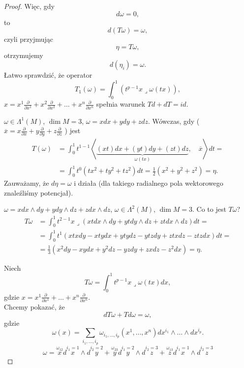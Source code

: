 \documentclass[../main.tex]{subfiles}
\begin{document}
\begin{proof}
    Więc, gdy
    \[
        d\omega = 0
    ,\]
to
    \[
        d(T\omega) = \omega
    ,\]
    czyli przyjmując
 \[
\eta = T\omega
,\]
otrzymujemy
\[
    d(\eta_i) = \omega
.\]
Łatwo sprawdzić, że operator
\[
    T_1(\omega) = \int_0^1\left(t^{p-1}x \lrcorner \omega(tx)\right)
,\]
$x = x^1 \frac{\partial }{\partial x^1} + x^2 \frac{\partial }{\partial x^2} + \ldots + x^n \frac{\partial }{\partial x^n}$ spełnia warunek $Td + dT = id$.
 \begin{przyklad}
     $\omega \in \Lambda^1(M)$, $\dim M = 3$, $\omega = xdx + ydy + zdz$. Wówczas, gdy ($\overline{x} = x \frac{\partial }{\partial x} + y \frac{\partial }{\partial y} + z \frac{\partial }{\partial z}$ ) jest
     \begin{align*}
         T(\omega) &= \int_0^1 t^{1-1} \left<\underbrace{(xt)dx + (yt)dy + (zt)dz}_{\omega(tx)},\quad \overline{x} \right>dt = \\
         &= \int_0^1t^0\left( tx^2 + ty^2 + tz^2 \right) dt = \frac{1}{2}\left( x^2 + y^2 + z^2 \right) = \eta.
     \end{align*}
     Zauważamy, że $d\eta = \omega$ i działa (dla takiego radialnego pola wektorowego znaleźliśmy potencjał).
\end{przyklad}
\begin{przyklad}
    $\omega = xdx\land dy + ydy\land dz + zdx\land dz$,  $\omega\in \Lambda^2(M)$, $\dim M = 3$.
    Co to jest $T\omega$?
    \begin{align*}
        T\omega &= \int_0^1t^{2-1} x \lrcorner \left( xt dx\land dy + yt dy\land dz + zt dx\land dz \right) dt = \\
        &= \int_0^1 t^1\left( xtx dy - xt ydx + yt ydz - ytzdy + ztxdz - ztzdx \right)dt = \\
        &= \frac{1}{3}\left( x^2dy - xydx + y^2dz - yzdy + zxdz - z^2dx \right) = \eta
    .\end{align*}
\end{przyklad}
Niech
\[
    T\omega = \int_0^1 t^{p-1} x \lrcorner \omega(tx)dx
,\]
gdzie $x = x^1 \frac{\partial }{\partial x^1} + \ldots + x^n \frac{\partial }{\partial x^n} $.\\
Chcemy pokazać, że
\[
dT\omega + Td\omega = \omega
,\]
gdzie
\[
    \omega(x) = \sum_{i_1, \ldots, i_p}\omega_{i_1, \ldots, i_p}(x^1, \ldots, x^n)dx^{i_1}\land \ldots\land dx^{i_p}
.\]
\[
    \omega = \overset{\omega_{12}}{x} d\overset{i_1 = 1}{x}\land d\overset{i_2 = 2}{y} + \overset{\omega_{23}}{y}d\overset{i_1 = 2}{y}\land d\overset{i_2 = 3}{z} + \overset{\omega_{13}}{z}d\overset{i_1 = 1}{x}\land d\overset{i_2 = 3}{z}
\]
\end{proof}
\end{document}
